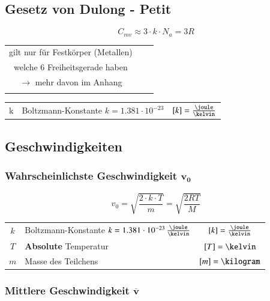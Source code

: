 \subsection{Gesetz von Dulong - Petit}

$$\boxed{ C_{mv} \approx 3\cdot k \cdot N_a = 3R}$$

\begin{tabular}{c c c}
	gilt nur für Festkörper (Metallen) &  &                 \\
	welche 6 Freiheitsgerade haben      &                              &                 \\
$\to$ mehr davon im Anhang & & \\
\medskip

\end{tabular}

\begin{tabular}{c l c}
	k              & Boltzmann-Konstante $ k = 1.381 \cdot 10^{-23}$  & $[k] = \frac{\joule}{\kelvin}$
\end{tabular}


\subsection{Geschwindigkeiten}

\subsubsection{Wahrscheinlichste Geschwindigkeit $\boldsymbol{v_0}$}

\vspace{-0.2cm}

$$ \boxed{ v_0 = \sqrt{\frac{2 \cdot k \cdot T}{m}} = \sqrt{\frac{2RT}{M}} } $$


\begin{tabular}{c l c}
	$k$ & Boltzmann-Konstante $k = 1.381 \cdot 10^{-23} \, \frac{\joule}{\kelvin}$	& $[k] = \frac{\joule}{\kelvin}$	\\
	$T$ & \textbf{Absolute} Temperatur 												& $[T] = \kelvin$ 					\\
	$m$ & Masse des Teilchens 														& $[m] = \kilogram$
\end{tabular}

\subsubsection{Mittlere Geschwindigkeit $\bm{\overline{v}}$}

\vspace{-0.2cm}

